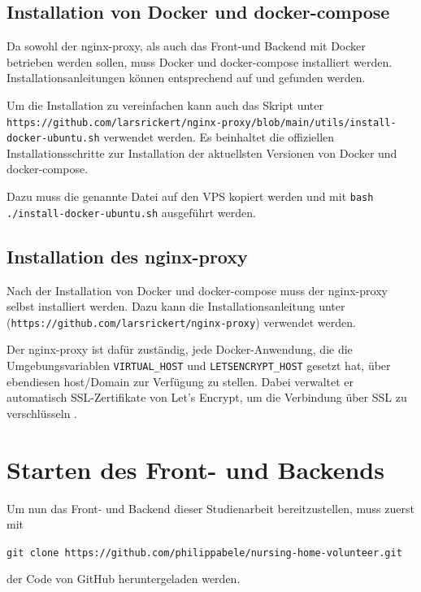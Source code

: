 \subsection{Installation von Docker und docker-compose}
Da sowohl der nginx-proxy, als auch das Front-und Backend mit Docker betrieben werden sollen, muss Docker und docker-compose installiert werden. Installationsanleitungen können entsprechend auf \cite{DockerInstallation} und \cite{DockerDomposeInstallation} gefunden werden.

Um die Installation zu vereinfachen kann auch das Skript unter \lstinline{https://github.com/larsrickert/nginx-proxy/blob/main/utils/install-docker-ubuntu.sh} verwendet werden. Es beinhaltet die offiziellen Installationsschritte zur Installation der aktuellsten Versionen von Docker und docker-compose.

Dazu muss die genannte Datei auf den \ac{VPS} kopiert werden und mit \lstinline{bash ./install-docker-ubuntu.sh} ausgeführt werden.

\subsection{Installation des nginx-proxy}
Nach der Installation von Docker und docker-compose muss der nginx-proxy selbst installiert werden. Dazu kann die Installationsanleitung unter \cite{NginxProxyInstallation} (\lstinline{https://github.com/larsrickert/nginx-proxy}) verwendet werden.

Der nginx-proxy ist dafür zuständig, jede Docker-Anwendung, die die Umgebungsvariablen \lstinline{VIRTUAL_HOST} und \lstinline{LETSENCRYPT_HOST} gesetzt hat, über ebendiesen host/Domain zur Verfügung zu stellen. Dabei verwaltet er automatisch SSL-Zertifikate von Let's Encrypt, um die Verbindung über SSL zu verschlüsseln \cite{NginxProxyInstallation}.

\section{Starten des Front- und Backends}
\label{sec:start-applications}
Um nun das Front- und Backend dieser Studienarbeit bereitzustellen, muss zuerst mit

\begin{center}
  \lstinline{git clone https://github.com/philippabele/nursing-home-volunteer.git}
\end{center}

der Code von GitHub heruntergeladen werden.

